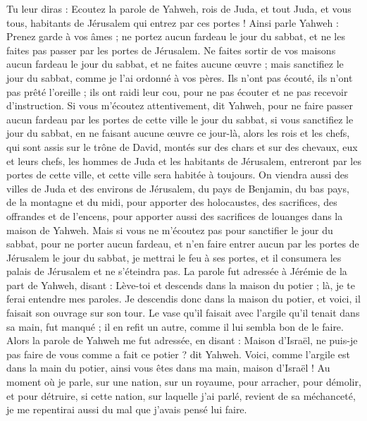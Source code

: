 \begin{multicols}{2}
Tu leur diras : Ecoutez la parole de Yahweh, rois de Juda, et tout Juda, et vous tous, habitants de Jérusalem qui entrez par ces portes !
Ainsi parle Yahweh : Prenez garde à vos âmes ; ne portez aucun fardeau le jour du sabbat, et ne les faites pas passer par les portes de Jérusalem.
Ne faites sortir de vos maisons aucun fardeau le jour du sabbat, et ne faites aucune œuvre ; mais sanctifiez le jour du sabbat, comme je l'ai ordonné à vos pères.
Ils n'ont pas écouté, ils n'ont pas prêté l'oreille ; ils ont raidi leur cou, pour ne pas écouter et ne pas recevoir d'instruction.
Si vous m'écoutez attentivement, dit Yahweh, pour ne faire passer aucun fardeau par les portes de cette ville le jour du sabbat, si vous sanctifiez le jour du sabbat, en ne faisant aucune œuvre ce jour-là,
alors les rois et les chefs, qui sont assis sur le trône de David, montés sur des chars et sur des chevaux, eux et leurs chefs, les hommes de Juda et les habitants de Jérusalem, entreront par les portes de cette ville, et cette ville sera habitée à toujours.
On viendra aussi des villes de Juda et des environs de Jérusalem, du pays de Benjamin, du bas pays, de la montagne et du midi, pour apporter des holocaustes, des sacrifices, des offrandes et de l'encens, pour apporter aussi des sacrifices de louanges dans la maison de Yahweh.
Mais si vous ne m'écoutez pas pour sanctifier le jour du sabbat, pour ne porter aucun fardeau, et n'en faire entrer aucun par les portes de Jérusalem le jour du sabbat, je mettrai le feu à ses portes, et il consumera les palais de Jérusalem et ne s'éteindra pas.
\VerseOne{}La parole fut adressée à Jérémie de la part de Yahweh, disant :
Lève-toi et descends dans la maison du potier ; là, je te ferai entendre mes paroles.
Je descendis donc dans la maison du potier, et voici, il faisait son ouvrage sur son tour.
Le vase qu'il faisait avec l'argile qu'il tenait dans sa main, fut manqué ; il en refit un autre, comme il lui sembla bon de le faire.
Alors la parole de Yahweh me fut adressée, en disant :
Maison d'Israël, ne puis-je pas faire de vous comme a fait ce potier ? dit Yahweh. Voici, comme l'argile est dans la main du potier, ainsi vous êtes dans ma main, maison d'Israël !
Au moment où je parle, sur une nation, sur un royaume, pour arracher, pour démolir, et pour détruire,
si cette nation, sur laquelle j'ai parlé, revient de sa méchanceté, je me repentirai aussi du mal que j'avais pensé lui faire.

\end{multicols}
